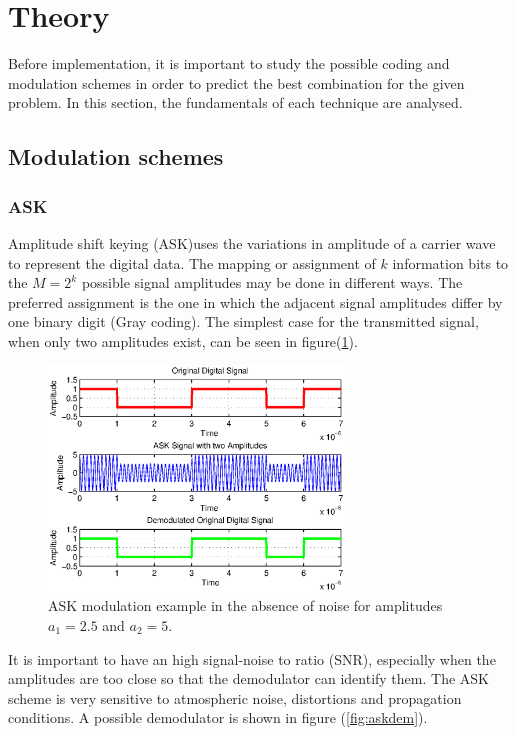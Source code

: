 \documentclass[12pt,a4paper,openright]{article}
\begin{document}


\section{Theory}

Before implementation, it is important to study the possible coding and modulation schemes in order to predict the best combination for the given problem. In this section, the fundamentals of each technique are analysed.

\subsection{Modulation schemes}

\subsubsection{ASK}
Amplitude shift keying (ASK)uses the variations in amplitude of a carrier wave to represent the digital data. The mapping or assignment of $k$ information bits to the $M=2^k$ possible signal amplitudes may be done in different ways. The preferred assignment is the one in which the adjacent  signal amplitudes differ by one binary digit (Gray coding). The simplest case for the transmitted signal, when only two amplitudes exist, can be seen in figure(\ref{fig:ask}). 

\begin{figure}[h]
  \centering
    \includegraphics[width=0.7\textwidth]{ASKexample.eps}
    \caption{ASK modulation example in the absence of noise for amplitudes $a_1=2.5$ and $a_2=5$.}
    \label{fig:ask}
\end{figure}

It is important to have an high signal-noise to ratio (SNR), especially when the amplitudes are too close so that the demodulator can identify them. The ASK scheme is very sensitive to atmospheric noise, distortions and propagation conditions.  A possible demodulator is shown in figure (\ref{fig:askdem}).
\end{document}
